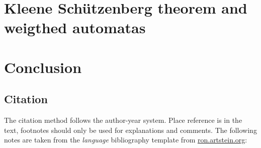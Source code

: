 \documentclass[12pt,letterpaper]{article}
\begin{document}
\section{Kleene Schützenberg theorem and weigthed automatas}
\section{Conclusion}


\subsection{Citation} 
\label{sec:cit}

The citation method follows the author-year system. Place reference is in the text, footnotes should only be used for explanations and comments. The following notes are taken from the \emph{language} bibliography template from \url{ron.artstein.org}:\newline
\end{document}

